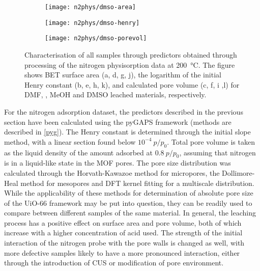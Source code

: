 \begin{figure}[p]
	\begin{subfigure}{0.33\linewidth}
		\parbox[c]{0.12\linewidth}{\caption{}%
			\label{def:fig:n2phys-dmso-area}}%
		\parbox[b]{0.88\linewidth}{%
			\texttt{[image: n2phys/dmso-area]}%
		}%
	\end{subfigure}%
	\begin{subfigure}{0.33\linewidth}
	\parbox[c]{0.12\linewidth}{\caption{}%
		\label{def:fig:n2phys-dmso-henry}}%
	\parbox[b]{0.88\linewidth}{%
		\texttt{[image: n2phys/dmso-henry]}%
	}%
	\end{subfigure}%
	\begin{subfigure}{0.33\linewidth}
	\parbox[c]{0.12\linewidth}{\caption{}%
		\label{def:fig:n2phys-dmso-porevol}}%
	\parbox[b]{0.88\linewidth}{%
		\texttt{[image: n2phys/dmso-porevol]}%
	}%
	\end{subfigure}%

	\caption{Characterisation of all samples through predictors
	obtained through processing of the nitrogen physisorption 
	data at \SI{200}{\degreeCelsius}. The figure shows \gls{BET} surface
	area (a, d, g, j), the logarithm of the initial Henry constant (b, e, h, k), 
	and calculated pore volume (c, f, i ,l) for \gls{DMF}, , \gls{MeOH} and 
	\gls{DMSO} leached materials, respectively.}%
	\label{def:fig:nitrogen-predictors}
	
\end{figure}

For the nitrogen adsorption dataset, the predictors described in the 
previous section have been calculated using the pyGAPS framework
(methods are described in \autoref{pyg}). The Henry constant is determined 
through the initial slope method, with a linear section found below 
\(10^{-4}~p/p_0\). Total pore volume is taken as the liquid density
of the amount adsorbed at \(0.8~p/p_0\), assuming that 
nitrogen is in a liquid-like state in the \gls{MOF} pores. The pore
size distribution was calculated through the Horvath-Kawazoe
method for micropores, the Dollimore-Heal method for mesopores
and \gls{DFT} kernel fitting for a multiscale distribution. While 
the applicability of these methods for determination of absolute
pore size of the UiO-66 framework may be put into question, 
they can be readily used to compare between different samples
of the same material.
In general, the leaching process has a positive effect on 
surface area and pore volume, both of which increase 
with a higher concentration of acid used. The strength of 
the initial interaction of the nitrogen probe with the pore 
walls is changed as well, with more defective samples likely
to have a more pronounced interaction, either through the introduction
of \gls{CUS} or modification of pore environment.

